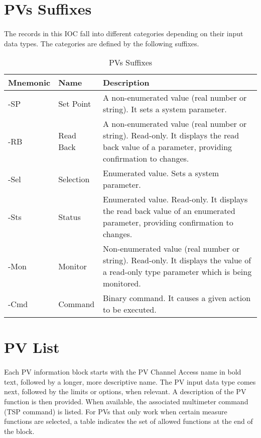 \documentclass[openany]{article}
\begin{document}
\section{PVs Suffixes}

	\paragraph{} The records in this IOC fall into different categories depending on their input data types. The categories are defined by the following suffixes.

	\begin{table}[!h]
		\center
		\caption{PVs Suffixes}
		\begin{tabular}{m{3cm} m{3cm} m{7cm}}
			\hline
			\bfseries Mnemonic & \bfseries Name & \bfseries Description \\ \hline
			-SP & Set Point & A non-enumerated value (real number or string). It sets a system parameter. \\ \hline
			-RB & Read Back & A non-enumerated value (real number or string). Read-only. It displays the read back value of a parameter, providing confirmation to changes. \\ \hline
			-Sel & Selection & Enumerated value. Sets a system parameter. \\ \hline
			-Sts & Status & Enumerated value. Read-only. It displays the read back value of an enumerated parameter, providing confirmation to changes. \\ \hline
			-Mon & Monitor & Non-enumerated value (real number or string). Read-only. It displays the value of a read-only type parameter which is being monitored. \\ \hline
			-Cmd & Command & Binary command. It causes a given action to be executed. \\ \hline
		\end{tabular}
	\end{table}
\FloatBarrier

\section{PV List}

		\paragraph{} Each PV information block starts with the PV Channel Access name in bold text, followed by a longer, more descriptive name. The PV input data type comes next, followed by the limits or options, when relevant. A description of the PV function is then provided. When available, the associated multimeter command (TSP command) is listed. For PVs that only work when certain measure functions are selected, a table indicates the set of allowed functions at the end of the block.
\end{document}
